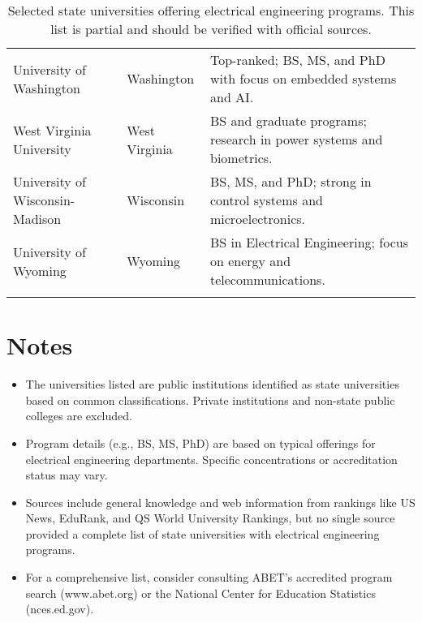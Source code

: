 \documentclass[12pt]{article}
\begin{document}
\begin{longtable}{p{} p{} p{}}
University of Washington & Washington & Top-ranked; BS, MS, and PhD with focus on embedded systems and AI. \\
West Virginia University & West Virginia & BS and graduate programs; research in power systems and biometrics. \\
University of Wisconsin-Madison & Wisconsin & BS, MS, and PhD; strong in control systems and microelectronics. \\
University of Wyoming & Wyoming & BS in Electrical Engineering; focus on energy and telecommunications. \\
\bottomrule
\caption{Selected state universities offering electrical engineering programs. This list is partial and should be verified with official sources.}
\label{tab:ee_programs}
\end{longtable}

\section*{Notes}
\begin{itemize}
    \item The universities listed are public institutions identified as state universities based on common classifications. Private institutions and non-state public colleges are excluded.
    \item Program details (e.g., BS, MS, PhD) are based on typical offerings for electrical engineering departments. Specific concentrations or accreditation status may vary.
    \item Sources include general knowledge and web information from rankings like US News, EduRank, and QS World University Rankings, but no single source provided a complete list of state universities with electrical engineering programs.
    \item For a comprehensive list, consider consulting ABET’s accredited program search (www.abet.org) or the National Center for Education Statistics (nces.ed.gov).
\end{itemize}
\end{document}
